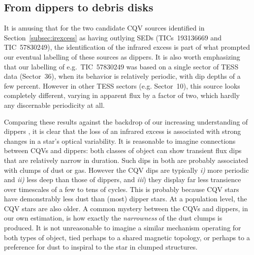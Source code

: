 \documentclass[11pt,twocolumn,tighten]{aastex63}
\begin{document}


\subsection{From dippers to debris disks}
\label{subsec:discdippers}

It is amusing that for the two candidate CQV sources identified in
Section~\ref{subsec:irexcess} as having outlying SEDs (TICs~193136669
and TIC~57830249), the identification of the infrared excess is part
of what prompted our eventual labelling of these sources as dippers.
It is also worth emphasizing that our labelling of e.g.~TIC~57830249
was based on a single sector of TESS data (Sector~36), when its
behavior is relatively periodic, with dip depths of a few percent.
However in other TESS sectors (e.g. Sector~10), this source looks
completely different, varying in apparent flux by a factor of two,
which hardly any discernable periodicity at all.

Comparing these results against the backdrop of our increasing
understanding of dippers
\citep[e.g.][]{2014AJ....147...82C,2016ApJ...816...69A,2021ApJ...908...16R,2022ApJS..263...14C},
it is clear that the loss of an infrared excess is associated with
strong changes in a star's optical variability.  It is reasonable to
imagine connections between CQVs and dippers: both classes of object
can show transient flux dips that are relatively narrow in duration.
Such dips in both are probably associated with clumps of dust or gas.
However the CQV dips are typically {\it i)} more periodic and {\it
ii)} less deep than those of dippers, and {\it iii}) they display far
less transience over timescales of a few to tens of cycles.  This is
probably because CQV stars have demonstrably less dust than (most)
dipper stars.  At a population level, the CQV stars are also older.  A
common mystery between the CQVs and dippers, in our own estimation, is
how exactly the {\it narrowness} of the dust clumps is produced.  It
is not unreasonable to imagine a similar mechanism operating for both
types of object, tied perhaps to a shared magnetic topology, or
perhaps to a preference for dust to inspiral to the star in clumped
structures.
\end{document}
